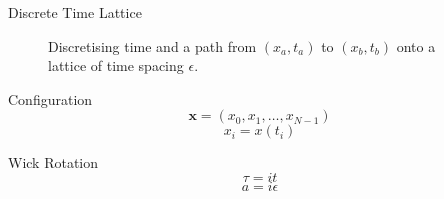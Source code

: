 \documentclass{beamer}
\begin{document}
\begin{frame}{Discrete Time Lattice}
{\begin{figure}
            \caption{Discretising time and a path from $\left(x_a,t_a\right)$ to $\left(x_b,t_b\right)$  onto a lattice of time spacing $\epsilon$.}
            \label{fig:TimeLattice}
        \end{figure}
        }
        
        {
            \begin{block}{Configuration}
            {
                \begin{equation*}
                    \label{eq:Configuration}
                        \bm{x} = \left(x_0,x_1,\dots,x_{N-1}\right)
                \end{equation*}
                \begin{equation*}
                    \label{eq:SiteNotation}
                        x_i=x\left(t_i\right)
                \end{equation*}
            }
            \end{block}
        {
            \begin{block}{Wick Rotation}
                {
                    \begin{equation*}
                    \label{eq:WickRotation}
                        \tau = it 
                    \end{equation*}
                }
                {
                    \begin{equation*}
                        \label{eq:WickRotationLattice}
                        a = i \epsilon
                    \end{equation*}
                }
            \end{block}
        }
        }
        
    \end{frame}
\end{document}
